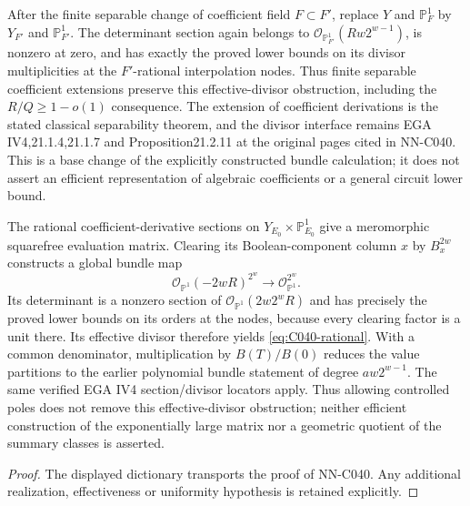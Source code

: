 \begin{geometricstatement}[NN-C040]
After the finite separable change of coefficient field $F\subset F'$,
replace $Y$ and $\mathbb P^1_F$ by $Y_{F'}$ and $\mathbb P^1_{F'}$.
The determinant section again belongs to
$\mathcal O_{\mathbb P^1_{F'}}(Rw2^{w-1})$, is nonzero at zero, and
has exactly the proved lower bounds on its divisor multiplicities at
the $F'$-rational interpolation nodes. Thus finite separable coefficient
extensions preserve this effective-divisor obstruction, including the
$R/Q\ge1-o(1)$ consequence. The extension of coefficient derivations is
the stated classical separability theorem, and the divisor interface
remains EGA IV4,21.1.4,21.1.7 and Proposition21.2.11 at the original
pages cited in NN-C040. This is a base change of the explicitly
constructed bundle calculation; it does not assert an efficient
representation of algebraic coefficients or a general circuit lower
bound.


The rational coefficient-derivative sections on
$Y_{E_0}\times\mathbb P^1_{E_0}$ give a meromorphic squarefree
evaluation matrix. Clearing its Boolean-component column $x$ by
$B_x^{2w}$ constructs a global bundle map
\[
 \mathcal O_{\mathbb P^1}(-2wR)^{2^w}
       \longrightarrow \mathcal O_{\mathbb P^1}^{2^w}.
\]
Its determinant is a nonzero section of
$\mathcal O_{\mathbb P^1}(2w2^wR)$ and has precisely the proved
lower bounds on its orders at the nodes, because every clearing
factor is a unit there. Its effective divisor therefore yields
\eqref{eq:C040-rational}. With a common denominator, multiplication
by $B(T)/B(0)$ reduces the value partitions to the earlier polynomial
bundle statement of degree $a w2^{w-1}$. The same verified EGA IV4
section/divisor locators apply. Thus allowing controlled poles does
not remove this effective-divisor obstruction; neither efficient
construction of the exponentially large matrix nor a geometric
quotient of the summary classes is asserted.

\end{geometricstatement}
\begin{proof} The displayed dictionary transports the proof of NN-C040. Any additional realization, effectiveness or uniformity hypothesis is retained explicitly.\end{proof}


